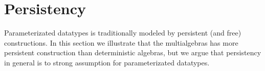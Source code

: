 

 





\section{Persistency}
\label{se:persistency}
Parameterizated datatypes is traditionally modeled by persistent (and free) constructions.
In this section we illustrate that the multialgebras has more persistent construction than deterministic algebras, but we argue that persistency in general is to strong assumption for parameterizated datatypes.


